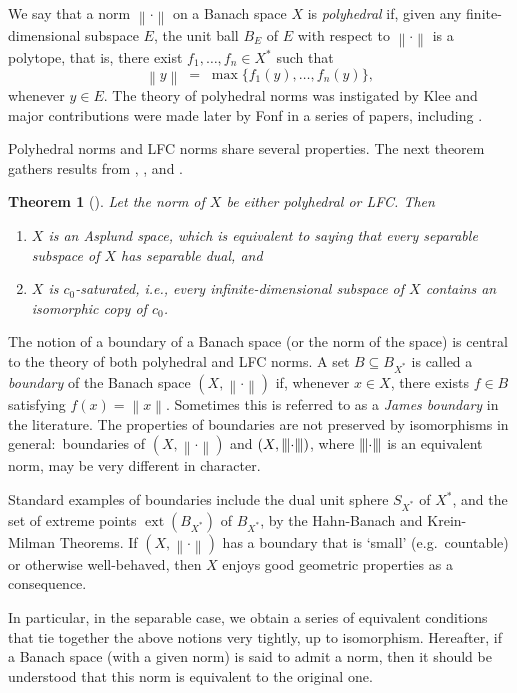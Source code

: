 \documentclass[12pt,reqno]{amsart}
\newcommand{\n}[1]{\ensuremath{\left\|{#1}\right\|}}
\newcommand{\ndot}{\ensuremath{\left\|\cdot\right\|}}
\newcommand{\oneton}[2]{\ensuremath{{#1}_1,\ldots,{#1}_{#2}}}
\newcommand{\tndot}{\ensuremath{\left|\kern-.9pt\left|\kern-.9pt\left|\cdot\right|\kern-.9pt\right|\kern-.9pt\right|}}
\DeclareMathOperator{\ext}{ext}
\newtheorem{thm}{Theorem}[section]
\theoremstyle{definition}
\begin{document}
We say that a norm $\ndot$ on a Banach space $X$ is {\em polyhedral} if, given any finite-dimensional subspace $E$, the unit ball $B_E$ of $E$ with respect to $\ndot$ is a polytope, that is, there exist $\oneton{f}{n} \in X^*$ such that
\[
\n{y} \;=\; \max\{f_1(y),\dots, f_n(y)\},
\]
whenever $y \in E$. The theory of polyhedral norms was instigated by Klee \cite{klee:59} and major contributions were made later by Fonf in a series of papers, including \cite{fonf:80,fonf:81,fonf:00}.

Polyhedral norms and LFC norms share several properties. The next theorem gathers results from \cite[Theorem 5]{fonf:80}, \cite{pwz:81}, \cite[Corollary 2]{fz:97} and \cite[Theorem 3.9]{fonf:00}.

\begin{thm}[\cite{fonf:80,pwz:81,fz:97,fonf:00}]\label{thm_nec_conditions}
Let the norm of $X$ be either polyhedral or LFC. Then
\begin{enumerate}
\item $X$ is an Asplund space, which is equivalent to saying that every separable subspace of $X$ has separable dual, and
\item $X$ is $c_0$-saturated, i.e., every infinite-dimensional subspace of $X$ contains an isomorphic copy of $c_0$.
\end{enumerate}
\end{thm}

The notion of a boundary of a Banach space (or the norm of the space) is central to the theory of both polyhedral and LFC norms. A set $B \subseteq B_{X^*}$ is called a {\em boundary} of the Banach space $(X,\ndot)$ if, whenever $x \in X$, there exists $f \in B$ satisfying $f(x)=\n{x}$. Sometimes this is referred to as a {\em James boundary} in the literature. The properties of boundaries are not preserved by isomorphisms in general:~boundaries of $(X,\ndot)$ and $(X,\tndot)$, where $\tndot$ is an equivalent norm, may be very different in character.

Standard examples of boundaries include the dual unit sphere $S_{X^*}$ of $X^*$, and the set of extreme points $\ext(B_{X^*})$ of $B_{X^*}$, by the Hahn-Banach and Krein-Milman Theorems. If $(X,\ndot)$ has a boundary that is `small' (e.g.\ countable) or otherwise well-behaved, then $X$ enjoys good geometric properties as a consequence.

In particular, in the separable case, we obtain a series of equivalent conditions that tie together the above notions very tightly, up to isomorphism. Hereafter, if a Banach space (with a given norm) is said to admit a norm, then it should be understood that this norm is equivalent to the original one.
\end{document}
